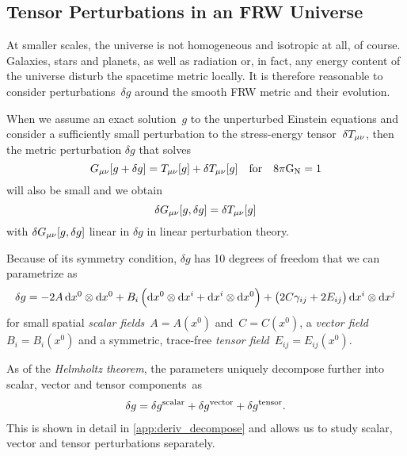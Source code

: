 \documentclass[parskip=half]{scrreprt}
\newcommand{\todocheck}[1]{\todo[color=blue!40]{#1}}
\begin{document}
\subsection{Tensor Perturbations in an FRW Universe}\label{sec:perturb}

At smaller scales, the universe is not homogeneous and isotropic at all, of course. Galaxies, stars and planets, as well as radiation or, in fact, any energy content of the universe disturb the spacetime metric locally. It is therefore reasonable to consider perturbations~\(\delta g\) around the smooth FRW metric and their evolution.

When we assume an exact solution~\(g\) to the unperturbed Einstein equations and consider a sufficiently small perturbation to the stress-energy tensor~\(\delta T_{\mu \nu}\), then the metric perturbation \(\delta g\) that solves
\begin{equation}
	G_{\mu \nu}[g + \delta g] = T_{\mu \nu}[g] + \delta T_{\mu \nu}[g] \quad \text{for} \quad 8 \pi \mathrm{G}_\mathrm{N} = 1
\end{equation}
will also be small  and we obtain
\begin{equation}\label{eq:perturbed_einstein_eqns}
	\delta G_{\mu \nu}[g,\delta g] = \delta T_{\mu \nu}[g]
\end{equation}
with \(\delta G_{\mu \nu}[g,\delta g]\) linear in \(\delta g\) in linear perturbation theory.

Because of its symmetry condition, \(\delta g\) has 10 degrees of freedom that we can parametrize as \citep{Schulz}
\begin{align}
	\delta g = -2A \dif{x^0}\otimes\dif{x^0} + B_i\del{\dif{x^0}\otimes\dif{x^i}+\dif{x^i}\otimes\dif{x^0}} + \del{2C\gamma_{ij} + 2E_{ij}}\dif{x^i}\otimes\dif{x^j}
\end{align}\todocheck{notation}
for small spatial \emph{scalar fields}~\(A=A(x^0)\) and~\(C=C(x^0)\), a \emph{vector field}~\(B_i=B_i(x^0)\) and a symmetric, trace-free \emph{tensor field}~\(E_{ij}=E_{ij}(x^0)\).

As of the \emph{Helmholtz theorem}, the parameters uniquely decompose further into scalar, vector and tensor components~as
\begin{align}
	\delta g = \delta g^{\mathrm{scalar}} + \delta g^{\mathrm{vector}} + \delta g^{\mathrm{tensor}} \mathpunct{.}
\end{align}
This is shown in detail in \autoref{app:deriv_decompose} and allows us to study scalar, vector and tensor perturbations separately. 
\end{document}
